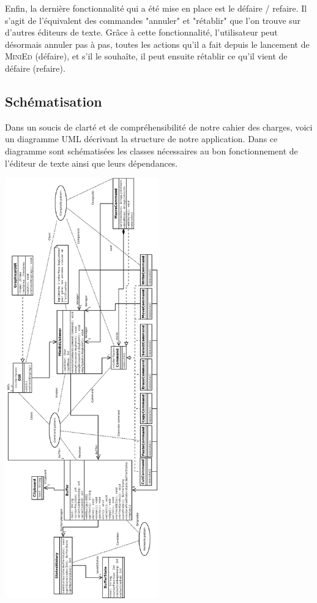 \documentclass[a4paper]{article}
\begin{document}
			Enfin, la dernière fonctionnalité qui a été mise en place est le défaire / refaire. Il s'agit de l'équivalent des commandes "annuler" et "rétablir" que l'on trouve sur d'autres éditeurs de texte. Grâce à cette fonctionnalité, l'utilisateur peut désormais annuler pas à pas, toutes les actions qu'il a fait depuis le lancement de \textsc{MiniEd} (défaire), et s'il le souhaîte, il peut ensuite rétablir ce qu'il vient de défaire (refaire).

			\vspace{0.5cm}

		\subsection{Schématisation}

		\vspace{0.5cm}

		Dans un soucis de clarté et de compréhensibilité de notre cahier des charges, voici un diagramme UML décrivant la structure de notre application. Dans ce diagramme sont schématisées les classes nécessaires au bon fonctionnement de l’éditeur de texte ainsi que leurs dépendances.

	\begin{center}
		\includegraphics[width=0.5\textwidth]{UML.png}~
	\end{center}
\end{document}
